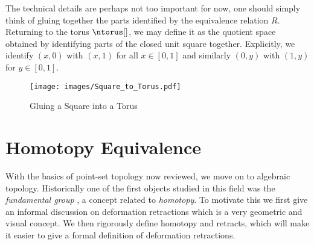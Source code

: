 \documentclass{book}                                                           %
\begin{document}
                The technical details are perhaps not too important for now, one
                should simply think of gluing together the parts identified by
                the equivalence relation $R$. Returning to the torus
                $\ntorus[]$, we may define it as the quotient space obtained by
                identifying parts of the closed unit square together.
                Explicitly, we identify $(x,0)$ with $(x,1)$ for all $x\in[0,1]$
                and similarly $(0,y)$ with $(1,y)$ for $y\in[0,1]$.
                \begin{figure}[H]
                    \centering
                    \captionsetup{type=figure}
                    \texttt{[image: images/Square\_to\_Torus.pdf]}
                    \caption{Gluing a Square into a Torus}
                    \label{fig:Square_to_Torus}
                \end{figure}
        \section{Homotopy Equivalence}
            With the basics of point-set topology now reviewed, we move on to
            algebraic topology. Historically one of the first objects studied in
            this field was the \textit{fundamental group}%
            , a concept related to \textit{homotopy}.
            To motivate this we first give an informal discussion on deformation
            retractions which is a very geometric and visual concept. We then
            rigorously define homotopy and retracts, which will make it easier
            to give a formal definition of deformation retractions.
\end{document}
